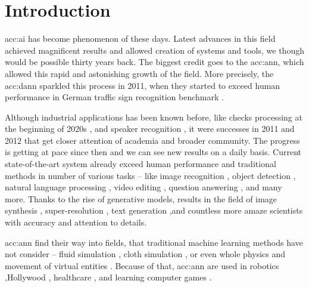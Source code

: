 \chapter{Introduction}

\acrfull{acc:ai} has become phenomenon of these days. Latest advances in this field achieved magnificent results and allowed creation of systems and tools, we though would be possible thirty years back. The biggest credit goes to the \acrfull{acc:ann}, which allowed this rapid and astonishing growth of the field. More precisely, the \acrfull{acc:dann} sparkled this process in 2011, when they started to exceed human performance in German traffic sign recognition benchmark \cite{CIRESAN2012333}.

Although industrial applications has been known before, like checks processing at the beginning of 2020s \cite{ChecksDocumentRecognition}, and speaker recognition \cite{HECK2000181}, it were successes in 2011 and 2012 that get closer attention of academia and broader community. The progress is getting at pace since then and we can see new results on a daily basis. Current state-of-the-art system already exceed human performance and traditional methods in number of various tasks -- like image recognition \cite{pham2021meta}\cite{ZawadzkaGosk2019}, object detection \cite{ghiasi2020simple}\cite{lehner2019patch}, natural language processing \cite{gpt3}, video editing \cite{lu2020layered}, question answering \cite{yamada2020luke}\cite{yamada2020luke}, and many more. Thanks to the rise of generative models, results in the field of image synthesis \cite{StateOfTheArtImageSythesis} \cite{esser2020taming}\cite{dalle}, super-resolution \cite{Sun_2020}\linebreak\cite{Chadha_2020}, text generation \cite{gpt3}\cite{malmi2019encode},\linebreak and countless more amaze scientists with accuracy and attention to details.

\acrshort{acc:ann} find their way into fields, that traditional machine learning methods have not consider -- fluid simulation \cite{um2018liquid}\cite{Kim_2019}, cloth simulation \cite{lee2019efficient}\cite{SRBO20}, or even whole physics \cite{PhysicsSimulation}\cite{sanchezgonzalez2020learning} and movement of virtual entities \cite{PhysicsBasedCharaterSImulation}\cite{zhang2020vid2player}. Because of that, \acrshort{acc:ann} are used in robotics \cite{pierson2017deep}\cite{Lee_2020},Hollywood \cite{aiinhollywood},  healthcare \cite{fakoor2013using}\cite{BreastCancerAISystem}, and learning computer games \cite{openai2019dota}\cite{alphastar}.

